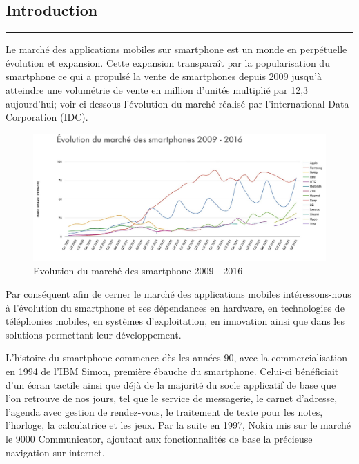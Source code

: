 \documentclass[11]{article}
\begin{document}
\thispagestyle{empty}

\newpage
\thispagestyle{empty}
\strut


\newpage
\thispagestyle{empty}
\begin{center}
\part{Introduction}
\setcounter{page}{5}
\noindent\rule{12cm}{0.4pt}
\end{center}

Le marché des applications mobiles sur smartphone est un monde en perpétuelle évolution et expansion. Cette expansion transparaît par la popularisation du smartphone ce qui a propulsé la vente de smartphones depuis 2009 jusqu’à atteindre une volumétrie de vente en million d’unités multiplié par 12,3 aujourd’hui; voir ci-dessous l’évolution du marché réalisé par l’international Data Corporation (IDC).


\begin{figure}[h]
    \centering
    \includegraphics[width=1\textwidth]{evolution-market}
    \caption{Evolution du marché des smartphone 2009 - 2016}
    \label{bat}
\end{figure}

\vspace{0.5cm}

Par conséquent afin de cerner le marché des applications mobiles intéressons-nous à l’évolution du smartphone et ses dépendances en hardware, en technologies de téléphonies mobiles, en systèmes d’exploitation, en innovation ainsi que dans les solutions permettant leur développement.

 \vspace{0.5cm}
 
L’histoire du smartphone commence dès les années 90, avec la commercialisation en 1994 de l’IBM Simon, première ébauche du smartphone. Celui-ci bénéficiait d’un écran tactile ainsi que déjà de la majorité du socle applicatif de base que l’on retrouve de nos jours, tel que le service de messagerie, le carnet d’adresse, l’agenda avec gestion de rendez-vous, le traitement de texte pour les notes, l’horloge, la calculatrice et les jeux. Par la suite en 1997, Nokia mis sur le marché le 9000 Communicator, ajoutant aux fonctionnalités de base la précieuse navigation sur internet.
\end{document}
